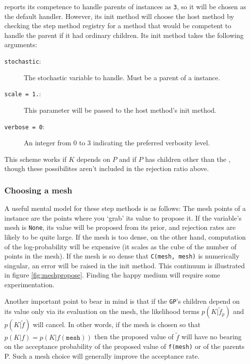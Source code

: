 \documentclass[]{manual}
\begin{document}
 reports its competence to handle parents of  instances as \texttt{3}, so it will be chosen as the default handler. However, its init method will choose the host method by checking the step method registry for a method that would be competent to handle the parent if it had ordinary children. Its init method takes the following arguments: 
\begin{description}
    \item[\texttt{stochastic}:] The stochastic variable to handle. Must be a parent of a  instance.
    \item[\texttt{scale = 1.}:] This parameter will be passed to the host method's init method.
    \item[\texttt{verbose = 0}:] An integer from 0 to 3 indicating the preferred verbosity level.
\end{description}

This scheme works if $K$ depends on $P$ and if $P$ has children other than the , though these possibilites aren't included in the rejection ratio above. 

\subsubsection{Choosing a mesh} A useful mental model for these step methods is as follows: The mesh points of a  instance are the points where you `grab' its value to propose it. If the variable's mesh is \texttt{None}, its value will be proposed from its prior, and rejection rates are likely to be quite large. If the mesh is too dense, on the other hand, computation of the log-probability will be expensive (it scales as the cube of the number of points in the mesh). If the mesh is so dense that \texttt{C(mesh, mesh)} is numerically singular, an error will be raised in the init method. This continuum is illustrated in figure \ref{fig:meshpropose}. Finding the happy medium will require some experimentation.

Another important point to bear in mind is that if the \texttt{GP}'s children depend on its value only via its evaluation on the mesh, the likelihood terms $p(K|\tilde f_p)$ and $p(K|\tilde f)$ will cancel. In other words, if the mesh is chosen so that $p(K|f)=p(K|f(\texttt{mesh}))$ then the proposed value of $\tilde f$ will have no bearing on the acceptance probability of the proposed value of \texttt{f(mesh)} or of the parents P. Such a mesh choice will generally improve the acceptance rate.
\end{document}
